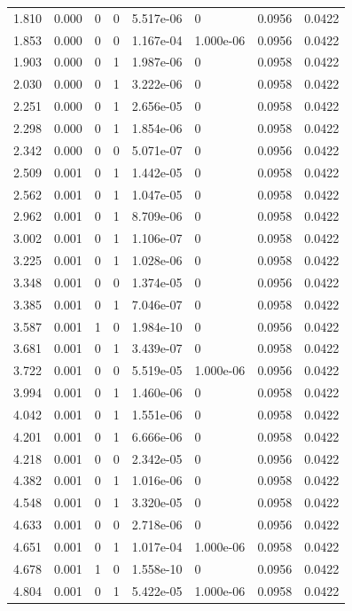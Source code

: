 \documentclass[preview]{standalone}
\begin{document}
{{\begin{tabular}{L{1.2cm}C{1.2cm} C{0.3cm}C{0.5cm} C{1.4cm}C{1.4cm} C{1.4cm}C{1.4cm}}
  1.810  &  0.000  & 0     &  0 &  5.517e-06  & 0  & 0.0956 &  0.0422   \\ 
  1.853  &  0.000  & 0     &  0 &  1.167e-04  & 1.000e-06  & 0.0956 &  0.0422   \\ 
  1.903  &  0.000  & 0     &  1 &  1.987e-06  & 0  & 0.0958 &  0.0422   \\ 
  2.030  &  0.000  & 0     &  1 &  3.222e-06  & 0  & 0.0958 &  0.0422   \\ 
  2.251  &  0.000  & 0     &  1 &  2.656e-05  & 0  & 0.0958 &  0.0422   \\ 
  2.298  &  0.000  & 0     &  1 &  1.854e-06  & 0  & 0.0958 &  0.0422   \\ 
  2.342  &  0.000  & 0     &  0 &  5.071e-07  & 0  & 0.0956 &  0.0422   \\ 
  2.509  &  0.001  & 0     &  1 &  1.442e-05  & 0  & 0.0958 &  0.0422   \\ 
  2.562  &  0.001  & 0     &  1 &  1.047e-05  & 0  & 0.0958 &  0.0422   \\ 
  2.962  &  0.001  & 0     &  1 &  8.709e-06  & 0  & 0.0958 &  0.0422   \\ 
  3.002  &  0.001  & 0     &  1 &  1.106e-07  & 0  & 0.0958 &  0.0422   \\ 
  3.225  &  0.001  & 0     &  1 &  1.028e-06  & 0  & 0.0958 &  0.0422   \\ 
  3.348  &  0.001  & 0     &  0 &  1.374e-05  & 0  & 0.0956 &  0.0422   \\ 
  3.385  &  0.001  & 0     &  1 &  7.046e-07  & 0  & 0.0958 &  0.0422   \\ 
  3.587  &  0.001  & 1     &  0 &  1.984e-10  & 0  & 0.0956 &  0.0422   \\ 
  3.681  &  0.001  & 0     &  1 &  3.439e-07  & 0  & 0.0958 &  0.0422   \\ 
  3.722  &  0.001  & 0     &  0 &  5.519e-05  & 1.000e-06  & 0.0956 &  0.0422   \\ 
  3.994  &  0.001  & 0     &  1 &  1.460e-06  & 0  & 0.0958 &  0.0422   \\ 
  4.042  &  0.001  & 0     &  1 &  1.551e-06  & 0  & 0.0958 &  0.0422   \\ 
  4.201  &  0.001  & 0     &  1 &  6.666e-06  & 0  & 0.0958 &  0.0422   \\ 
  4.218  &  0.001  & 0     &  0 &  2.342e-05  & 0  & 0.0956 &  0.0422   \\ 
  4.382  &  0.001  & 0     &  1 &  1.016e-06  & 0  & 0.0958 &  0.0422   \\ 
  4.548  &  0.001  & 0     &  1 &  3.320e-05  & 0  & 0.0958 &  0.0422   \\ 
  4.633  &  0.001  & 0     &  0 &  2.718e-06  & 0  & 0.0956 &  0.0422   \\ 
  4.651  &  0.001  & 0     &  1 &  1.017e-04  & 1.000e-06  & 0.0958 &  0.0422   \\ 
  4.678  &  0.001  & 1     &  0 &  1.558e-10  & 0  & 0.0956 &  0.0422   \\ 
  4.804  &  0.001  & 0     &  1 &  5.422e-05  & 1.000e-06  & 0.0958 &  0.0422   \\ 
\hline 
\end{tabular} 

}}
\end{document}

